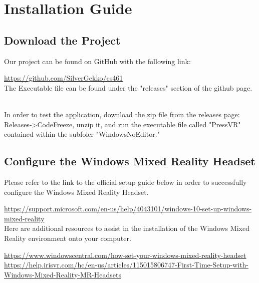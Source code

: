 \documentclass[onecolumn, draftclsnofoot,10pt, compsoc]{IEEEtran}
\begin{document}
\section{Installation Guide}
\subsection{Download the Project}

Our project can be found on GitHub with the following link:

\noindent
\href{https://github.com/SilverGekko/cs461}{https://github.com/SilverGekko/cs461}\\

\noindent
The Executable file can be found under the "releases" section of the github page.

\\

In order to test the application, download the zip file from the releases page: Releases->CodeFreeze, unzip it, and run the executable file called "PressVR" contained within the subfoler "WindowsNoEditor."

\subsection{Configure the Windows Mixed Reality Headset}

Please refer to the link to the official setup guide below in order to successfully configure the Windows Mixed Reality Headset.

\noindent
\href{https://support.microsoft.com/en-us/help/4043101/windows-10-set-up-windows-mixed-reality}{https://support.microsoft.com/en-us/help/4043101/windows-10-set-up-windows-mixed-reality}\\

Here are additional resources to assist in the installation of the Windows Mixed Reality environment onto your computer. 

\noindent
\href{https://www.windowscentral.com/how-set-your-windows-mixed-reality-headset}{https://www.windowscentral.com/how-set-your-windows-mixed-reality-headset}\\
\noindent
\href{https://help.irisvr.com/hc/en-us/articles/115015806747-First-Time-Setup-with-Windows-Mixed-Reality-MR-Headsets}{https://help.irisvr.com/hc/en-us/articles/115015806747-First-Time-Setup-with-Windows-Mixed-Reality-MR-Headsets}\\
\end{document}
